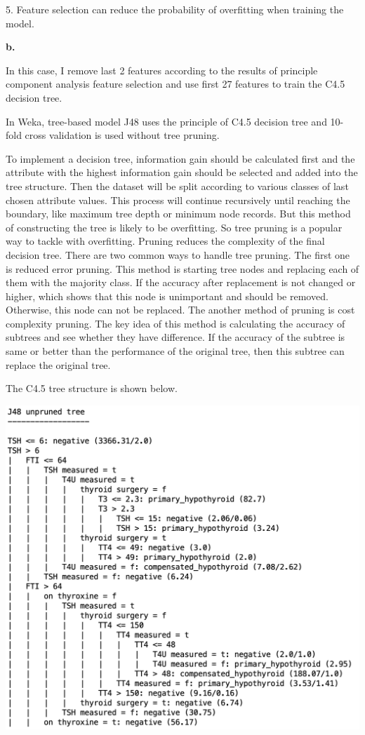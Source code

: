\documentclass{article}
\begin{document}
5. Feature selection can reduce the probability of overfitting when training the model.

\bigskip

\textbf{b.}

In this case, I remove last 2 features according to the results of principle component analysis feature selection and use first 27 features to train the C4.5 decision tree.

In Weka, tree-based model J48 uses the principle of C4.5 decision tree and 10-fold cross validation is used without tree pruning.

To implement a decision tree, information gain should be calculated first and the attribute with the highest information gain should be selected and added into the tree structure. Then the dataset will be split according to various classes of last chosen attribute values. This process will continue recursively until reaching the boundary, like maximum tree depth or minimum node records. But this method of constructing the tree is likely to be overfitting. So tree pruning is a popular way to tackle with overfitting. Pruning reduces the complexity of the final decision tree. There are two common ways to handle tree pruning. The first one is reduced error pruning. This method is starting tree nodes and replacing each of them with the majority class. If the accuracy after replacement is not changed or higher, which shows that this node is unimportant and should be removed. Otherwise, this node can not be replaced. The another method of pruning is cost complexity pruning. The key idea of this method is calculating the accuracy of subtrees and see whether they have difference. If the accuracy of the subtree is same or better than the performance of the original tree, then this subtree can replace the original tree.

The C4.5 tree structure is shown below.

\includegraphics[scale=0.5]{tree_structure.png}
\end{document}
